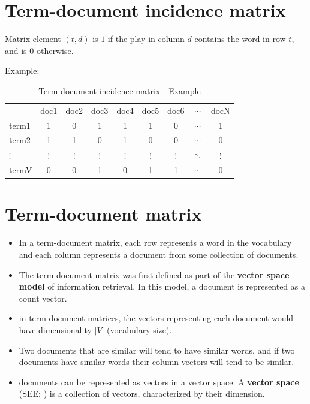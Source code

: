 \section{Term-document incidence matrix \cite{ir-1}}\label{Term-document incidence matrix}

Matrix element $(t, d)$ is $1$ if the play in column $d$ contains the word in row $t$, and is $0$ otherwise.

Example:
\begin{table}[h]
    \centering
    \begin{tabular}{l c c c c c c c c}
         & doc1 & doc2 & doc3 & doc4 & doc5 & doc6 & $\cdots$ & docN \\
        term1 & 1 & 0 & 1 & 1 & 1 & 0 & $\cdots$ & 1 \\ 
        term2 & 1 & 1 & 0 & 1 & 0 & 0 & $\cdots$ & 0 \\ 
        $\vdots$ & $\vdots$ & $\vdots$ & $\vdots$ & $\vdots$ & $\vdots$ & $\vdots$ & $\ddots$ & $\vdots$ \\
        termV & 0 & 0 & 1 & 0 & 1 & 1 & $\cdots$ & 0 \\ 
    \end{tabular}
    \caption{Term-document incidence matrix - Example}
\end{table}



\section{Term-document matrix \cite{nlp-1}}\label{Term-document matrix}

\begin{itemize}
    \item In a term-document matrix, each row represents a word in the vocabulary and each column represents a document from some collection of documents.
    
    \item The term-document matrix was first defined as part of the \textbf{vector space model} of information retrieval. In this model, a document is represented as a count vector.

    \item in term-document matrices, the vectors representing each document would have dimensionality $|V|$ (vocabulary size).

    \item Two documents that are similar will tend to have similar words, and if two documents have similar words their column vectors will tend to be similar.

    \item documents can be represented as vectors in a vector space. A \textbf{vector space} (SEE: ) is a collection of vectors, characterized by their dimension.
\end{itemize}

